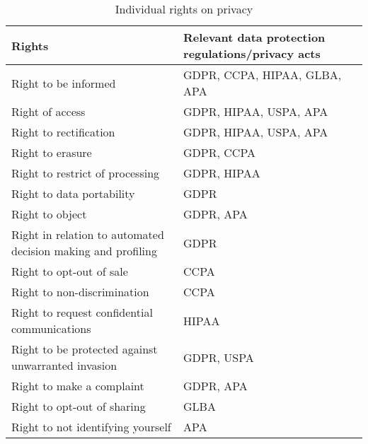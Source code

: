 \begin{table}
\caption{Individual rights on privacy}
\label{tab:rights}
\begin{tabular}{p{3.75cm} p{3.75cm}}
	\toprule
	Rights &
	Relevant data protection regulations/privacy acts \\ \midrule
	Right to be informed &
	GDPR, CCPA, HIPAA, GLBA, APA \\
	Right of access &
	GDPR, HIPAA, USPA, APA \\
	Right to rectification &
	GDPR, HIPAA, USPA, APA \\
	Right to erasure &
	GDPR, CCPA \\
	Right to restrict of processing &
	GDPR, HIPAA \\
	Right to data portability &
	GDPR \\
	Right to object &
	GDPR, APA \\
	Right in relation to automated decision making and profiling &
	GDPR \\
	Right to opt-out of sale &
	CCPA \\
	Right to non-discrimination &
	CCPA \\
	Right to request confidential communications &
	HIPAA \\
	Right to be protected against unwarranted invasion &
	GDPR, USPA \\
	Right to make a complaint &
	GDPR, APA \\
	Right to opt-out of sharing &
	GLBA \\
	Right to not identifying yourself &
	APA \\ \bottomrule
\end{tabular} 
\footnotesize {}
\end{table}

